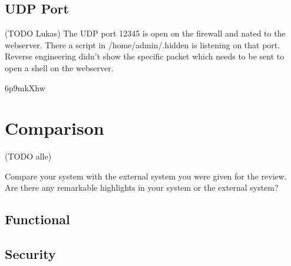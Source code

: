 \documentclass[english]{article}
\begin{document}
\subsection{UDP Port} (TODO Lukas)
The UDP port 12345 is open on the firewall and nated to the webserver. There a script in /home/admin/.hidden is listening on that port. Reverse engineering didn't show the specific packet which needs to be sent to open a shell on the webserver.

6p9mkXhw

\section{Comparison} (TODO alle)

Compare your system with the external system you were given for the review. Are there any remarkable highlights in your system or the external system?

\subsection{Functional}

\subsection{Security}
\end{document}
